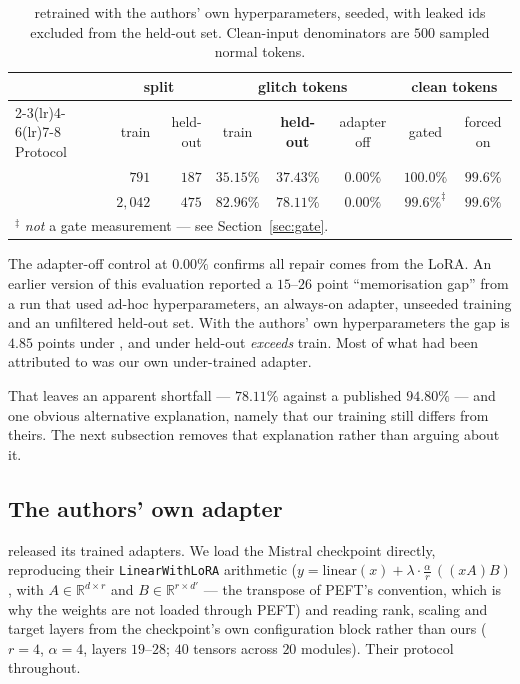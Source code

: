 \begin{table}[h]
\centering
\caption{\gc{} retrained with the authors' own hyperparameters, seeded, with
leaked ids excluded from the held-out set. Clean-input denominators are $500$
sampled normal tokens.}
\label{tab:gc}
\begin{tabular}{lrrccccc}
\toprule
& \multicolumn{2}{c}{split} & \multicolumn{3}{c}{glitch tokens} & \multicolumn{2}{c}{clean tokens} \\
\cmidrule(lr){2-3}\cmidrule(lr){4-6}\cmidrule(lr){7-8}
Protocol & train & held-out & train & \textbf{held-out} & adapter off & gated & forced on \\
\midrule
\Ppaper{} & $791$     & $187$ & $35.15\%$ & $\mathbf{37.43\%}$ & $0.00\%$ & $100.0\%$ & $99.6\%$ \\
\Pcode{}  & $2{,}042$ & $475$ & $82.96\%$ & $\mathbf{78.11\%}$ & $0.00\%$ & $99.6\%^{\ddagger}$ & $99.6\%$ \\
\bottomrule
\multicolumn{8}{l}{\footnotesize $^{\ddagger}$ \emph{not} a gate measurement --- see
Section~\ref{sec:gate}.}
\end{tabular}
\end{table}

The adapter-off control at $0.00\%$ confirms all repair comes from the LoRA. An
earlier version of this evaluation reported a $15$--$26$ point ``memorisation
gap'' from a run that used ad-hoc hyperparameters, an always-on adapter, unseeded
training and an unfiltered held-out set. With the authors' own hyperparameters
the gap is $4.85$ points under \Pcode{}, and under \Ppaper{} held-out
\emph{exceeds} train. Most of what had been attributed to \gc{} was our own
under-trained adapter.

That leaves an apparent shortfall --- $78.11\%$ against a published $94.80\%$ ---
and one obvious alternative explanation, namely that our training still differs
from theirs. The next subsection removes that explanation rather than arguing
about it.

\subsection{The authors' own adapter}
\label{sec:upstream}

\gc{} released its trained adapters. We load the Mistral checkpoint directly,
reproducing their \texttt{LinearWithLoRA} arithmetic
($y = \mathrm{linear}(x) + \lambda \cdot \tfrac{\alpha}{r}\,((x A) B)$, with
$A \in \mathbb{R}^{d \times r}$ and $B \in \mathbb{R}^{r \times d'}$ --- the
transpose of PEFT's convention, which is why the weights are not loaded through
PEFT) and reading rank, scaling and target layers from the checkpoint's own
configuration block rather than ours ($r = 4$, $\alpha = 4$, layers $19$--$28$;
$40$ tensors across $20$ modules). Their protocol throughout.

